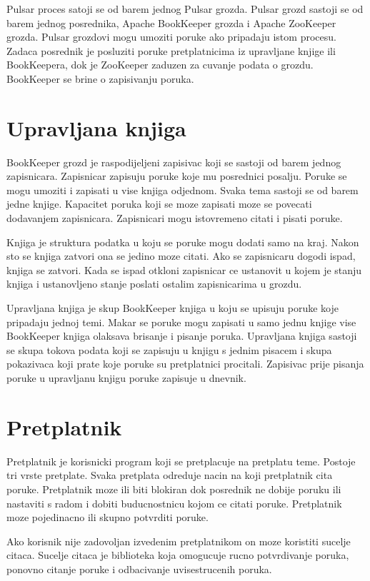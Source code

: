 \documentclass[times, utf8, diplomski, numeric]{fer}
\begin{document}
Pulsar proces satoji se od barem jednog Pulsar grozda. Pulsar grozd sastoji se od barem jednog posrednika, Apache BookKeeper grozda i Apache ZooKeeper grozda. Pulsar grozdovi mogu umoziti poruke ako pripadaju istom procesu. Zadaca posrednik je posluziti poruke pretplatnicima iz upravljane knjige ili BookKeepera, dok je ZooKeeper zaduzen za cuvanje podata o grozdu. BookKeeper se brine o zapisivanju poruka.


\chapter{Upravljana knjiga}
BookKeeper grozd je raspodijeljeni zapisivac koji se sastoji od barem jednog zapisnicara. Zapisnicar zapisuju poruke koje mu posrednici posalju. Poruke se mogu umoziti i zapisati u vise knjiga odjednom. Svaka tema sastoji se od barem jedne knjige. Kapacitet poruka koji se moze zapisati moze se povecati dodavanjem zapisnicara. Zapisnicari mogu istovremeno citati i pisati poruke. 

Knjiga je struktura podatka u koju se poruke mogu dodati samo na kraj. Nakon sto se knjiga zatvori ona se jedino moze citati. Ako se zapisnicaru dogodi ispad, knjiga se zatvori. Kada se ispad otkloni zapisnicar ce ustanovit u kojem je stanju knjiga i ustanovljeno stanje poslati ostalim zapisnicarima u grozdu. 

Upravljana knjiga je skup BookKeeper knjiga u koju se upisuju poruke koje pripadaju jednoj temi. Makar se poruke mogu zapisati u samo jednu knjige vise BookKeeper knjiga olaksava brisanje i pisanje poruka. Upravljana knjiga sastoji se skupa tokova podata koji se zapisuju u knjigu s jednim pisacem i skupa pokazivaca koji prate koje poruke su pretplatnici procitali. Zapisivac prije pisanja poruke u upravljanu knjigu poruke zapisuje u dnevnik.


\chapter{Pretplatnik}
Pretplatnik je korisnicki program koji se pretplacuje na pretplatu teme. Postoje tri vrste pretplate. Svaka pretplata odreduje nacin na koji pretplatnik cita poruke. Pretplatnik moze ili biti blokiran dok posrednik ne dobije poruku ili nastaviti s radom i dobiti buducnostnicu kojom ce citati poruke. Pretplatnik moze pojedinacno ili skupno potvrditi poruke.

Ako korisnik nije zadovoljan izvedenim pretplatnikom on moze koristiti sucelje citaca. Sucelje citaca je biblioteka koja omogucuje rucno potvrdivanje poruka, ponovno citanje poruke i odbacivanje uvisestrucenih poruka.
\end{document}
